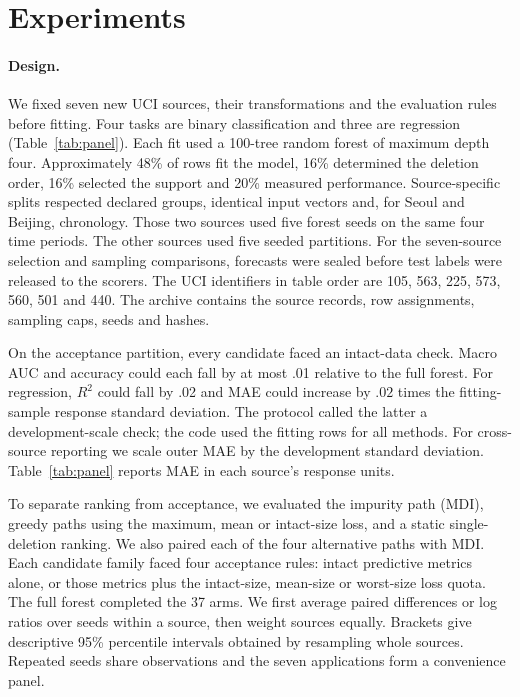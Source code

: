 \section{Experiments}
\paragraph{Design.}
We fixed seven new UCI sources, their transformations and the evaluation
rules before fitting. Four tasks are binary classification and three are
regression (Table~\ref{tab:panel}). Each fit used a 100-tree random forest
of maximum depth four. Approximately 48\% of rows fit the model, 16\%
determined the deletion order, 16\% selected the support and 20\% measured
performance. Source-specific splits respected declared groups, identical
input vectors and, for Seoul and Beijing, chronology. Those two sources
used five forest seeds on the same four time periods. The other sources
used five seeded partitions. For the seven-source selection and sampling
comparisons, forecasts were sealed before test labels were released to the scorers. The UCI identifiers in
table order are 105, 563, 225, 573, 560, 501 and 440. The archive contains the source records,
row assignments, sampling caps, seeds and hashes.

On the acceptance partition, every candidate faced an intact-data check.
Macro AUC and accuracy could each fall by at most .01 relative to the full
forest. For regression, $R^2$ could fall by .02 and MAE could increase by
$.02$ times the fitting-sample response standard deviation.
The protocol called the latter a development-scale check; the code used
the fitting rows for all methods. For cross-source reporting we scale
outer MAE by the development standard deviation. Table~\ref{tab:panel}
reports MAE in each source's response units.

To separate ranking from acceptance, we evaluated the impurity path
(MDI), greedy paths using the maximum, mean or intact-size loss, and a
static single-deletion ranking. We also paired each of the four alternative
paths with MDI. Each candidate family faced four acceptance rules:
intact predictive metrics alone, or those metrics plus the intact-size,
mean-size or worst-size loss quota. The full forest completed the 37 arms.
We first average paired differences or log ratios over seeds within a
source, then weight sources equally. Brackets give descriptive 95\%
percentile intervals obtained by resampling whole sources. Repeated seeds
share observations and the seven applications form a convenience panel.

